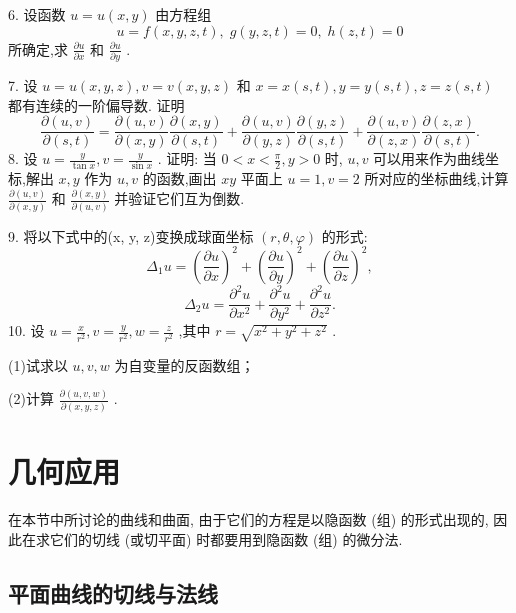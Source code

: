 6. 设函数 \(u = u\left( {x,y}\right)\) 由方程组
\[
u = f\left( {x,y,z,t}\right) ,\;g\left( {y,z,t}\right)  = 0,\;h\left( {z,t}\right)  = 0
\]
所确定,求 \(\frac{\partial u}{\partial x}\) 和 \(\frac{\partial u}{\partial y}\) .

7. 设 \(u = u\left( {x,y,z}\right) ,v = v\left( {x,y,z}\right)\) 和 \(x = x\left( {s,t}\right) ,y = y\left( {s,t}\right) ,z = z\left( {s,t}\right)\) 都有连续的一阶偏导数. 证明
\[
\frac{\partial \left( {u,v}\right) }{\partial \left( {s,t}\right) } = \frac{\partial \left( {u,v}\right) }{\partial \left( {x,y}\right) }\frac{\partial \left( {x,y}\right) }{\partial \left( {s,t}\right) } + \frac{\partial \left( {u,v}\right) }{\partial \left( {y,z}\right) }\frac{\partial \left( {y,z}\right) }{\partial \left( {s,t}\right) } + \frac{\partial \left( {u,v}\right) }{\partial \left( {z,x}\right) }\frac{\partial \left( {z,x}\right) }{\partial \left( {s,t}\right) }.
\]
8. 设 \(u = \frac{y}{\tan x},v = \frac{y}{\sin x}\) . 证明: 当 \(0 < x < \frac{\pi }{2},y > 0\) 时, \(u,v\) 可以用来作为曲线坐标,解出 \(x,y\) 作为 \(u,v\) 的函数,画出 \({xy}\) 平面上 \(u = 1,v = 2\) 所对应的坐标曲线,计算 \(\frac{\partial \left( {u,v}\right) }{\partial \left( {x,y}\right) }\) 和 \(\frac{\partial \left( {x,y}\right) }{\partial \left( {u,v}\right) }\) 并验证它们互为倒数.

9. 将以下式中的(x, y, z)变换成球面坐标 \(\left( {r,\theta ,\varphi }\right)\) 的形式:
\[
{\Delta }_{1}u = {\left( \frac{\partial u}{\partial x}\right) }^{2} + {\left( \frac{\partial u}{\partial y}\right) }^{2} + {\left( \frac{\partial u}{\partial z}\right) }^{2},
\]
\[
{\Delta }_{2}u = \frac{{\partial }^{2}u}{\partial {x}^{2}} + \frac{{\partial }^{2}u}{\partial {y}^{2}} + \frac{{\partial }^{2}u}{\partial {z}^{2}}.
\]
10. 设 \(u = \frac{x}{{r}^{2}},v = \frac{y}{{r}^{2}},w = \frac{z}{{r}^{2}}\) ,其中 \(r = \sqrt{{x}^{2} + {y}^{2} + {z}^{2}}\) .

(1)试求以 \(u,v,w\) 为自变量的反函数组；

(2)计算 \(\frac{\partial \left( {u,v,w}\right) }{\partial \left( {x,y,z}\right) }\) .

\section{几何应用}

在本节中所讨论的曲线和曲面, 由于它们的方程是以隐函数 (组) 的形式出现的, 因此在求它们的切线 (或切平面) 时都要用到隐函数 (组) 的微分法.

\subsection{平面曲线的切线与法线}

